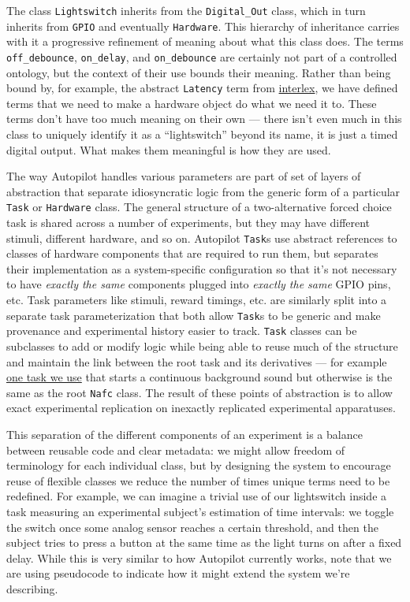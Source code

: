 The class \texttt{Lightswitch} inherits from the \texttt{Digital\_Out}
class, which in turn inherits from \texttt{GPIO} and eventually
\texttt{Hardware}. This hierarchy of inheritance carries with it a
progressive refinement of meaning about what this class does. The terms
\texttt{off\_debounce}, \texttt{on\_delay}, and \texttt{on\_debounce}
are certainly not part of a controlled ontology, but the context of
their use bounds their meaning. Rather than being bound by, for example,
the abstract \texttt{Latency} term from
\href{https://scicrunch.org/scicrunch/interlex/view/ilx_0106040\#annotations}{interlex},
we have defined terms that we need to make a hardware object do what we
need it to. These terms don't have too much meaning on their own ---
there isn't even much in this class to uniquely identify it as a
``lightswitch'' beyond its name, it is just a timed digital output. What
makes them meaningful is how they are used.

The way Autopilot handles various parameters are part of set of layers
of abstraction that separate idiosyncratic logic from the generic form
of a particular \texttt{Task} or \texttt{Hardware} class. The general
structure of a two-alternative forced choice task is shared across a
number of experiments, but they may have different stimuli, different
hardware, and so on. Autopilot \texttt{Task}s use abstract references to
classes of hardware components that are required to run them, but
separates their implementation as a system-specific configuration so
that it's not necessary to have \emph{exactly the same} components
plugged into \emph{exactly the same} GPIO pins, etc. Task parameters
like stimuli, reward timings, etc. are similarly split into a separate
task parameterization that both allow \texttt{Task}s to be generic and
make provenance and experimental history easier to track. \texttt{Task}
classes can be subclasses to add or modify logic while being able to
reuse much of the structure and maintain the link between the root task
and its derivatives --- for example
\href{https://github.com/auto-pi-lot/autopilot-plugin-wehrlab/blob/9cfffcf5fe1886d25658d4f1f0c0ffe41c18e2cc/gap/nafc_gap.py\#L13-L49}{one
task we use} that starts a continuous background sound but otherwise is
the same as the root \texttt{Nafc} class. The result of these points of
abstraction is to allow exact experimental replication on inexactly
replicated experimental apparatuses.

This separation of the different components of an experiment is a
balance between reusable code and clear metadata: we might allow freedom
of terminology for each individual class, but by designing the system to
encourage reuse of flexible classes we reduce the number of times unique
terms need to be redefined. For example, we can imagine a trivial use of
our lightswitch inside a task measuring an experimental subject's
estimation of time intervals: we toggle the switch once some analog
sensor reaches a certain threshold, and then the subject tries to press
a button at the same time as the light turns on after a fixed delay.
While this is very similar to how Autopilot currently works, note that
we are using pseudocode to indicate how it might extend the system we're
describing.

